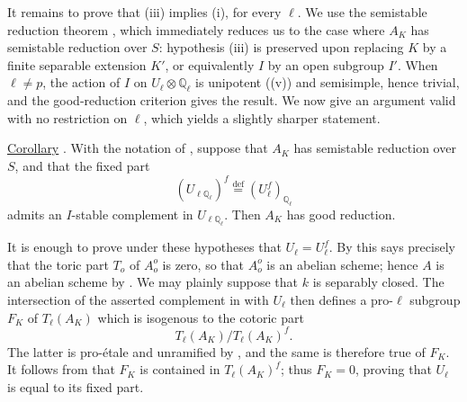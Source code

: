 It remains to prove that (iii) implies (i), for every $\ell$. We use
the semistable reduction theorem , which immediately reduces us to
the case where $A_K$ has semistable reduction over $S$: hypothesis
(iii) is preserved upon replacing $K$ by a finite separable extension
$K'$, or equivalently $I$ by an open subgroup $I'$. When $\ell\neq p$,
the action of $I$ on $U_\ell\otimes\mathbb Q_\ell$ is unipotent
((v)) and semisimple, hence trivial, and the good-reduction
criterion  gives the result. We now give an argument valid with no
restriction on $\ell$, which yields a slightly sharper statement.

\medskip
\noindent
\underline{Corollary} . With the notation of , suppose that
$A_K$ has semistable reduction over $S$, and that the fixed part
\[
 (U_{\ell\mathbb Q_\ell})^f
 \stackrel{\mathrm{def}}{=}(U_\ell^f)_{\mathbb Q_\ell}
\]
admits an $I$-stable complement in $U_{\ell\mathbb Q_\ell}$. Then
$A_K$ has good reduction.

It is enough to prove under these hypotheses that $U_\ell=U_\ell^f$.
By  this says precisely that the toric part $T_o$ of $A_o^o$ is
zero, so that $A_o^o$ is an abelian scheme; hence $A$ is an abelian
scheme by . We may plainly suppose that $k$ is separably closed.
The intersection of the asserted complement in  with $U_\ell$
then defines a pro-$\ell$ subgroup $F_K$ of $T_\ell(A_K)$ which is
isogenous to the cotoric part
\[
 T_\ell(A_K)/T_\ell(A_K)^f.
\]
The latter is pro-\'{e}tale and unramified by , and the same is
therefore true of $F_K$. It follows from  that $F_K$ is contained
in $T_\ell(A_K)^f$; thus $F_K=0$, proving that $U_\ell$ is equal to
its fixed part.
